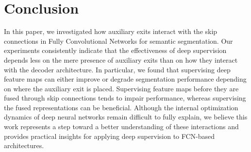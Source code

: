 \documentclass[runningheads]{llncs}
\begin{document}
\section{Conclusion}

In this paper, we investigated how auxiliary exits interact with the skip connections in Fully Convolutional Networks for semantic segmentation.
Our experiments consistently indicate that the effectiveness of deep supervision depends less on the mere presence of auxiliary exits than on how they interact with the decoder architecture.
In particular, we found that supervising deep feature maps can either improve or degrade segmentation performance depending on where the auxiliary exit is placed.
Supervising feature maps before they are fused through skip connections tends to impair performance, whereas supervising the fused representations can be beneficial.
Although the internal optimization dynamics of deep neural networks remain difficult to fully explain, we believe this work represents a step toward a better understanding of these interactions and provides practical insights for applying deep supervision to FCN-based architectures.
\end{document}
